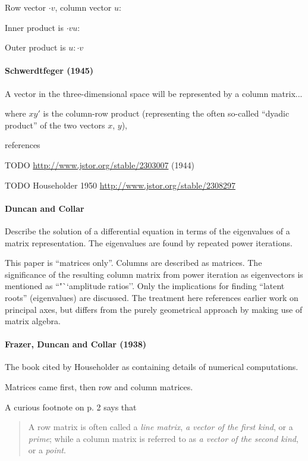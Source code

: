 Row vector $\cdot v$, column vector $u:$

Inner product is $\cdot v u:$

Outer product is $u:\cdot v$



\paragraph{Schwerdtfeger (1945)~\cite{Schwerdtfeger1945}}

A vector in the three-dimensional space will
be represented by a column matrix...

where $xy'$ is the column-row product (representing
the often so-called ``dyadic product'' of the
two vectors $x$, $y$),

references \cite{Schwerdtfeger1938,Murnaghan1938,Pipes1937}

TODO \url{http://www.jstor.org/stable/2303007} (1944)

TODO Householder 1950 \url{http://www.jstor.org/stable/2308297}

\paragraph{Duncan and Collar\cite{Duncan1934}}

Describe the solution of a differential equation in terms of the eigenvalues of
a matrix representation. The eigenvalues are found by repeated power iterations.

This paper is ``matrices only''. Columns are described as matrices.
The significance of the resulting column matrix from power iteration as
eigenvectors is mentioned as ``"``amplitude ratios''.
Only the implications for finding ``latent roots'' (eigenvalues) are discussed.
The treatment here references earlier work on principal axes, but differs from
the purely geometrical approach by making use of matrix algebra.

\paragraph{Frazer, Duncan and Collar (1938)~\cite{Frazer1938}}

The book cited by Householder as containing details of numerical computations.

Matrices came first, then row and column matrices.

A curious footnote on p. 2 says that
\begin{quote}
    A row matrix is often called a \textit{line matrix}, \textit{a vector of the first kind},
    or a \textit{prime}; while a column matrix is referred to as \textit{a vector of the second kind}, or a \textit{point}.
\end{quote}

